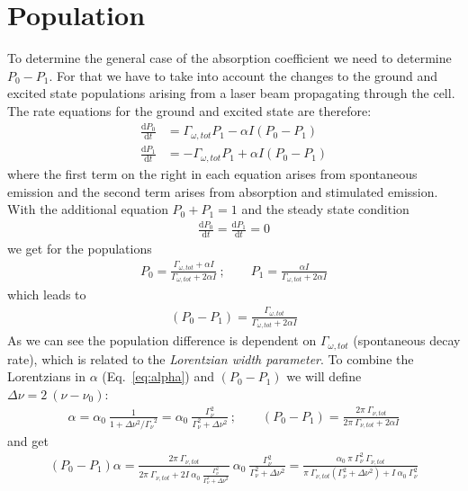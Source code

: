 \section{Population}   %

To determine the general case of the absorption coefficient we need to determine 
\(P_0-P_1 \). For that we have to take into account the changes to the ground and 
excited state populations arising from a laser beam propagating through the cell. 
The rate equations for the ground and excited state are therefore:
\begin{align}
    \frac{\mathrm{d}P_0}{\mathrm{d}t} &= \Gamma_{\omega,tot} P_1 - \alpha I (P_0-P_1) \nonumber \\
    \frac{\mathrm{d}P_1}{\mathrm{d}t} &= -\Gamma_{\omega,tot} P_1 + \alpha I (P_0-P_1)
\end{align} 
where the first term on the right in each equation arises from spontaneous emission 
and the second term arises from absorption and stimulated emission.\\
With the additional equation \(P_0+P_1=1 \) and the steady state condition
\begin{align}
    \frac{\mathrm{d}P_0}{\mathrm{d}t} = \frac{\mathrm{d}P_1}{\mathrm{d}t} = 0
\end{align}
we get for the populations
\begin{align}
        P_0 = \frac{\Gamma_{\omega,tot} + \alpha I}{\Gamma_{\omega,tot} + 2 \alpha I}~; 
        \qquad 
        P_1 = \frac{\alpha I}{\Gamma_{\omega,tot} + 2 \alpha I}
\end{align}
which leads to
\begin{align}
    (P_0-P_1) = \frac{\Gamma_{\omega,tot}}{\Gamma_{\omega,tot} + 2 \alpha I} 
\end{align}
As we can see the population difference is dependent on \(\Gamma_{\omega,tot} \) 
(spontaneous decay rate), which is related to the \textit{Lorentzian width parameter}. 
To combine the Lorentzians in \(\alpha \) (Eq.~\ref{eq:alpha}) and \( (P_0-P_1) \) 
we will define \(\Delta\nu = 2~(\nu-\nu_0) \):
\begin{align}
    \alpha = \alpha_0~\frac{1}{ 1+ \Delta\nu^2 / {\Gamma_\nu}^2 } 
    = \alpha_0~\frac{\Gamma_\nu^2}{\Gamma_\nu^2 + \Delta\nu^2}~; \qquad
    (P_0-P_1) = \frac{2\pi~\Gamma_{\nu,tot}}{2\pi~\Gamma_{\nu,tot} + 2 \alpha I}
\end{align}
and get
\begin{align}
    (P_0-P_1)\alpha = \frac{2\pi~\Gamma_{\nu,tot}}
    {2\pi~\Gamma_{\nu,tot} + 2I~\alpha_0~\frac{\Gamma_\nu^2}{\Gamma_\nu^2 + \Delta\nu^2}}~ 
    \alpha_0~\frac{\Gamma_\nu^2}{\Gamma_\nu^2 + \Delta\nu^2} = 
    \frac{\alpha_0~\pi~\Gamma_\nu^2~\Gamma_{\nu,tot}}
    {\pi~\Gamma_{\nu,tot} (\Gamma_\nu^2 + \Delta\nu^2)+I~\alpha_0~\Gamma_\nu^2}
\end{align}
